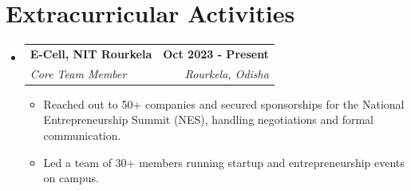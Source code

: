 \documentclass[letterpaper,11pt]{article}
\makeatletter
\newcommand{\resumeItem}[1]{
  \item\small{
    {#1 \vspace{-2pt}}
  }
}
\newcommand{\resumeSubheading}[4]{
  \vspace{-2pt}\item
    \begin{tabular*}{1.0\textwidth}[t]{l@{\extracolsep{\fill}}r}
      \textbf{#1} & \textbf{\small #2} \\
      \textit{\small#3} & \textit{\small #4} \\
    \end{tabular*}\vspace{-7pt}
}
\newcommand{\resumeSubHeadingListStart}{\begin{itemize}[leftmargin=0.0in, label={}]}
\newcommand{\resumeSubHeadingListEnd}{\end{itemize}}
\newcommand{\resumeItemListStart}{\begin{itemize}}
\newcommand{\resumeItemListEnd}{\end{itemize}\vspace{-5pt}}
\makeatother
\begin{document}
\section{Extracurricular Activities}
    \resumeSubHeadingListStart
        \resumeSubheading{E-Cell, NIT Rourkela}{Oct 2023 - Present}{Core Team Member}{Rourkela, Odisha}
            \resumeItemListStart
               \resumeItem{Reached out to 50+ companies and secured sponsorships for the National Entrepreneurship Summit (NES), handling negotiations and formal communication.}
               \resumeItem{Led a team of 30+ members running startup and entrepreneurship events on campus.}
            \resumeItemListEnd
    \resumeSubHeadingListEnd
\end{document}
